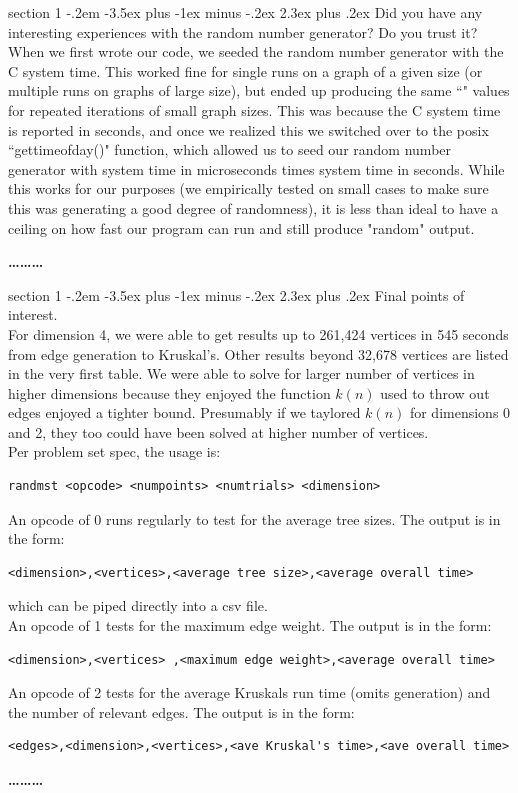 \documentclass[12pt]{article}
\makeatletter
\newenvironment{problem}{\@startsection
       {section}
       {1}
       {-.2em}
       {-3.5ex plus -1ex minus -.2ex}
       {2.3ex plus .2ex}
       {\pagebreak[3]%
       \large\bf\noindent{Problem }
       }
       }
       {%
       \begin{center}\large\bf \ldots\ldots\ldots\end{center}}
\makeatother
\begin{document}
\begin{problem}{}
Did you have any interesting experiences with the random number
generator? Do you trust it?\\

\noindent When we first wrote our code, we seeded the random number generator with the C system time.  This worked fine for single runs on a graph of a given size (or multiple runs on graphs of large size), but ended up producing the same ``\random" values for repeated iterations of small graph sizes.  This was because the C system time is reported in seconds, and once we realized this we switched over to the posix ``gettimeofday()" function, which allowed us to seed our random number generator with system time in microseconds times system time in seconds.  While this works for our purposes (we empirically tested on small cases to make sure this was generating a good degree of randomness), it is less than ideal to have a ceiling on how fast our program can run and still produce "random" output.  

\end{problem}

\begin{problem}{}
Final points of interest.\\

\noindent For dimension 4, we were able to get results up to 261,424 vertices in
545 seconds from edge generation to Kruskal's. Other results beyond 32,678
vertices are listed in the very first table. We were able to solve for
larger number of vertices in higher dimensions because they enjoyed
the function $k(n)$ used to throw out edges enjoyed a tighter bound. Presumably if
we taylored $k(n)$ for dimensions 0 and 2, they too could have been
solved at higher number of vertices.\\

\noindent Per problem set spec, the usage is:
\begin{verbatim}
randmst <opcode> <numpoints> <numtrials> <dimension>
\end{verbatim}
\noindent An opcode of 0 runs regularly to test for the average tree
sizes. The output is in the form:
\begin{verbatim}
<dimension>,<vertices>,<average tree size>,<average overall time>
\end{verbatim}
which can be piped directly into a csv file.\\
\noindent An opcode of 1  tests for the maximum edge weight. The output is in the form:
\begin{verbatim}
<dimension>,<vertices> ,<maximum edge weight>,<average overall time>
\end{verbatim}
\noindent An opcode of 2  tests for the average Kruskals run time
(omits generation) and the number of relevant edges. The output is in the form:
\begin{verbatim}
<edges>,<dimension>,<vertices>,<ave Kruskal's time>,<ave overall time>
\end{verbatim}

\end{problem}
\end{document}
